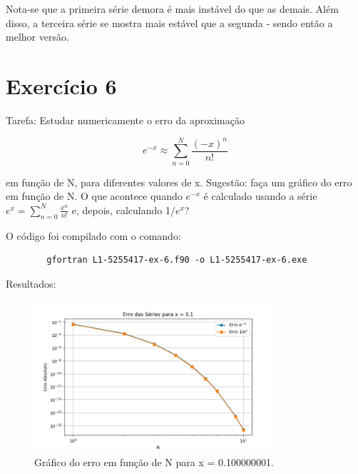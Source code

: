 \documentclass[12pt, a4paper]{article} %
\begin{document}
    Nota-se que a primeira s\'erie demora \'e mais inst\'avel do que as demais. Al\'em disso, a terceira s\'erie se mostra mais est\'avel que a segunda - sendo ent\~ao a melhor vers\~ao.

\section{Exerc\'icio 6}

    Tarefa: Estudar numericamente o erro da aproxima\c{c}\~ao

    \begin{equation} e^{-x} \approx \sum_{n=0}^N \frac{(-x)^n}{n!} \end{equation}

    em fun\c{c}\~ao de N, para diferentes valores de x. Sugest\~ao: fa\c{c}a um gr\'afico do erro em fun\c{c}\~ao de N. O que acontece quando $e^{-x}$  \'e calculado usando a s\'erie $e^x = \sum_{n=0}^{N} \frac{x^n}{n!}$ e, depois, calculando 1/$e^x$?


    O c\'odigo foi compilado com o comando:
    \begin{verbatim}
        gfortran L1-5255417-ex-6.f90 -o L1-5255417-ex-6.exe
    \end{verbatim}

    Resultados:
    \begin{figure}[H]
        \centering
        \includegraphics[width=0.8\textwidth]{../images/erro_x_0_1.png}
        \caption{Gr\'afico do erro em fun\c{c}\~ao de N para x = 0.100000001.}
    \end{figure}
\end{document}
